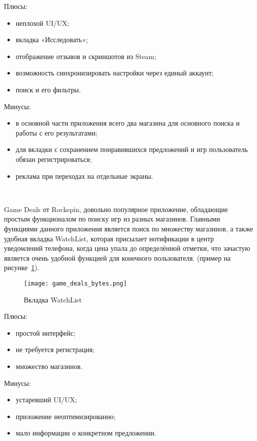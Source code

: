 Плюсы:
\begin{itemize}
 \item неплохой UI/UX;
 \item вкладка «Исследовать»;
 \item отображение отзывов и скриншотов из Steam;
 \item возможность синхронизировать настройки через единый аккаунт;
 \item поиск и его фильтры.
\end{itemize}
 
Минусы:
\begin{itemize}
 \item в основной части приложения всего два магазина для основного поиска и работы с его результатами;
 \item для вкладки с сохранением понравившихся предложений и игр пользователь обязан регистрироваться;
 \item реклама при переходах на отдельные экраны.
\end{itemize}
 
~\par
Game Deals от Rockspin, довольно популярное приложение, обладающие простым функционалом по поиску игр из разных магазинов. Главными функциями данного приложения является поиск по множеству магазинов, а также удобная вкладка WatchList, которая присылает нотификации в центр уведомлений телефона, когда цена упала до определённой отметки, что зачастую является очень удобной функцией для конечного пользователя. (пример на рисунке~\ref{fig:domain:game_deals_bytes}).
 
\begin{figure}[H]
 \centering
   \texttt{[image: game\_deals\_bytes.png]} 
   \caption{Вкладка WatchList}
   \label{fig:domain:game_deals_bytes}
\end{figure}
 
Плюсы:
\begin{itemize}
 \item простой интерфейс;
 \item не требуется регистрация;
 \item множество магазинов.
\end{itemize}
 
Минусы:
\begin{itemize}
 \item устаревший UI/UX;
 \item приложение неоптимизированно;
 \item мало информации о конкретном предложении.
\end{itemize}


